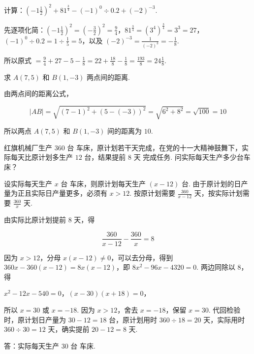 \begin{problem}
计算：\( \left( -1\frac{1}{2} \right)^2+81^{\frac{3}{4}}-\left( -1 \right)^0\div0.2+\left( -2 \right)^{-3} \).
\end{problem}

\begin{solution}
先逐项化简：\(\left(-1\frac{1}{2}\right)^2=\left(-\frac{3}{2}\right)^2=\frac{9}{4}\)，\(81^{\frac{3}{4}}=\left(3^4\right)^{\frac{3}{4}}=3^3=27\)，\(\left(-1\right)^0\div0.2=1\div\frac{1}{5}=5\)，以及 \(\left(-2\right)^{-3}=\frac{1}{\left(-2\right)^3}=-\frac{1}{8}\).

所以原式 \(=\frac{9}{4}+27-5-\frac{1}{8}=22+\frac{18}{8}-\frac{1}{8}=\frac{193}{8}=24\frac{1}{8}\).
\end{solution}

\begin{problem}
求 \(A\left(7,5\right)\) 和 \(B\left(1,-3\right)\) 两点间的距离.
\end{problem}

\begin{solution}
由两点间的距离公式，

\[
|AB|=\sqrt{\left(7-1\right)^2+\left(5-\left(-3\right)\right)^2}=\sqrt{6^2+8^2}=\sqrt{100}=10
\]

所以两点 \(A\left(7,5\right)\) 和 \(B\left(1,-3\right)\) 间的距离为 \(10\).
\end{solution}

\begin{problem}
红旗机械厂生产 \(360\text{ 台}\) 车床，原计划若干天完成，在党的十一大精神鼓舞下，实际每天比原计划多生产 \(12\text{ 台}\)，结果提前 \(8\text{ 天}\) 完成任务. 问实际每天生产多少台车床？
\end{problem}

\begin{solution}
设实际每天生产 \(x\text{ 台}\) 车床，则原计划每天生产 \(\left(x-12\right)\text{ 台}\). 由于原计划的日产量为正且实际日产量更多，必须有 \(x>12\). 按原计划需要 \(\frac{360}{x-12}\) 天，按实际计划需要 \(\frac{360}{x}\) 天.

由实际比原计划提前 \(8\) 天，得

\[
\frac{360}{x-12}-\frac{360}{x}=8
\]

因为 \(x>12\)，分母 \(x\left(x-12\right)\ne0\)，可以去分母，得到 \(360x-360\left(x-12\right)=8x\left(x-12\right)\)，即 \(8x^2-96x-4320=0\). 两边同除以 \(8\)，得

\(x^2-12x-540=0\)，\(\left(x-30\right)\left(x+18\right)=0\)，

所以 \(x=30\) 或 \(x=-18\). 因为 \(x>12\)，舍去 \(x=-18\)，保留 \(x=30\). 代回检验时，原计划日产量为 \(30-12=18\) 台，原计划用时 \(360\div18=20\) 天，实际用时 \(360\div30=12\) 天，确实提前 \(20-12=8\) 天.

答：实际每天生产 \(30\text{ 台}\) 车床.
\end{solution}

